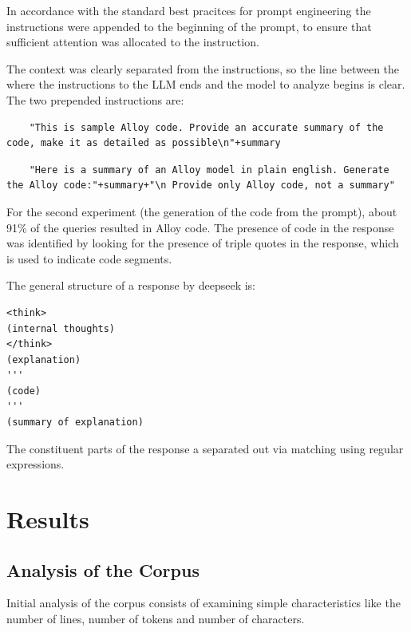 \documentclass[conference]{IEEEtran}
\begin{document}
In accordance with the standard best pracitces for prompt engineering the instructions were appended to the beginning of the prompt, to ensure that sufficient attention was allocated to the instruction. 

The context was clearly separated from the instructions, so the line between the where the instructions to the LLM ends and the model to analyze begins is clear. The two prepended instructions are:

\begin{lstlisting}
    "This is sample Alloy code. Provide an accurate summary of the code, make it as detailed as possible\n"+summary
\end{lstlisting}

\begin{lstlisting}
    "Here is a summary of an Alloy model in plain english. Generate the Alloy code:"+summary+"\n Provide only Alloy code, not a summary"
\end{lstlisting}

For the second experiment (the generation of the code from the prompt), about 91\% of the queries resulted in Alloy code. The presence of code in the response was identified by looking for the presence of triple quotes in the response, which is used to indicate code segments.

The general structure of a response by deepseek is:

\begin{lstlisting}
<think>
(internal thoughts)
</think>
(explanation)
'''
(code)
'''
(summary of explanation)
\end{lstlisting}

The constituent parts of the response a separated out via matching using regular expressions.

\section{Results}

\subsection{Analysis of the Corpus}

Initial analysis of the corpus consists of examining simple characteristics like the number of lines, number of tokens and number of characters.
\end{document}

